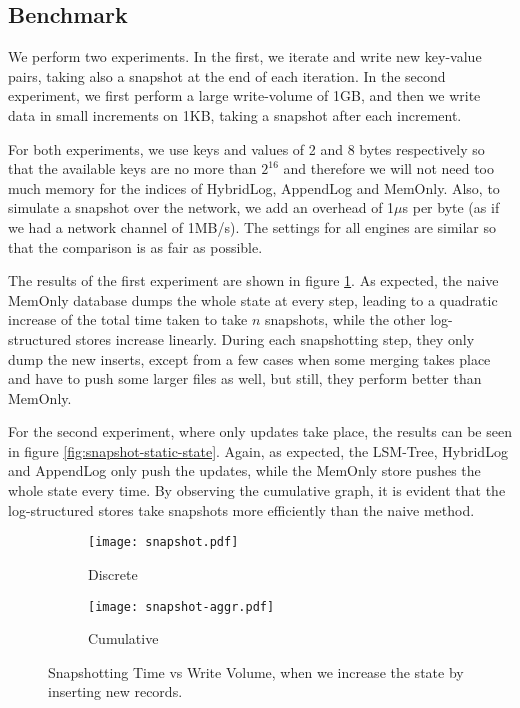 \subsection{Benchmark}

We perform two experiments. In the first, we iterate and write new key-value pairs, taking also a snapshot at the end of each iteration. In the second experiment, we first perform a large write-volume of 1GB, and then we write data in small increments on 1KB, taking a snapshot after each increment.

For both experiments, we use keys and values of 2 and 8 bytes respectively so that the available keys are no more than $2^{16}$ and therefore we will not need too much memory for the indices of HybridLog, AppendLog and MemOnly. Also, to simulate a snapshot over the network, we add an overhead of 1$\mu$s per byte (as if we had a network channel of 1MB/s). The settings for all engines are similar so that the comparison is as fair as possible.

The results of the first experiment are shown in figure \ref{fig:snapshot}. As expected, the naive MemOnly database dumps the whole state at every step, leading to a quadratic increase of the total time taken to take $n$ snapshots, while the other log-structured stores increase linearly. During each snapshotting step, they only dump the new inserts, except from a few cases when some merging takes place and have to push some larger files as well, but still, they perform better than MemOnly.

For the second experiment, where only updates take place, the results can be seen in figure \ref{fig:snapshot-static-state}. Again, as expected, the LSM-Tree, HybridLog and AppendLog only push the updates, while the MemOnly store pushes the whole state every time. By observing the cumulative graph, it is evident that the log-structured stores take snapshots more efficiently than the naive method.

\begin{figure}[h]
    \begin{subfigure}{.5\textwidth}
        \centering
        \texttt{[image: snapshot.pdf]}
        \caption{Discrete}
    \end{subfigure}
    \begin{subfigure}{.5\textwidth}
        \centering
        \texttt{[image: snapshot-aggr.pdf]}
        \caption{Cumulative}
    \end{subfigure}
    \caption{Snapshotting Time vs Write Volume, when we increase the state by inserting new records.}
    \label{fig:snapshot}
\end{figure}

